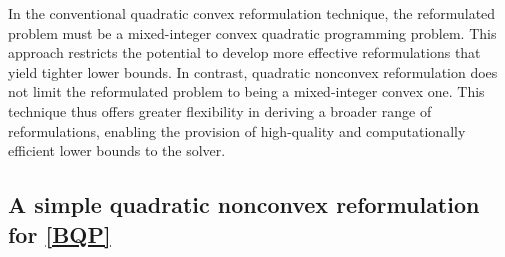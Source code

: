 \documentclass[pdflatex,sn-mathphys-num]{sn-jnl}%
\theoremstyle{thmstyleone}%
\theoremstyle{thmstyletwo}%
\theoremstyle{thmstylethree}%
\begin{document}
In the conventional quadratic convex reformulation technique, the reformulated problem must be a mixed-integer convex quadratic programming problem. This approach restricts the potential to develop more effective reformulations that yield tighter lower bounds. In contrast, quadratic nonconvex reformulation does not limit the reformulated problem to being a mixed-integer convex one. This technique thus offers greater flexibility in deriving a broader range of reformulations, enabling the provision of high-quality and computationally efficient lower bounds to the solver.


\subsection{A simple quadratic nonconvex reformulation for \eqref{BQP}}

\end{document}
